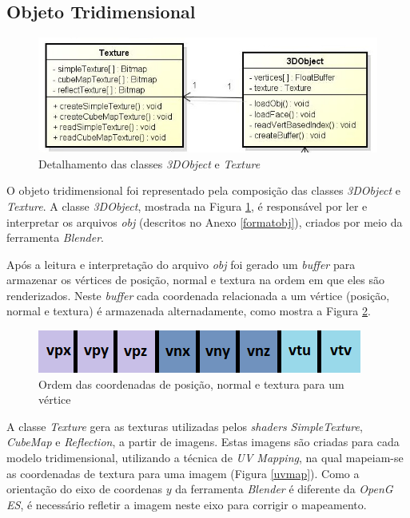 \subsection{Objeto Tridimensional}   

	\begin{figure}[ht]
	\centering
		\includegraphics[keepaspectratio=true,scale=0.6]{figuras/object_texture.jpg}
	\caption{Detalhamento das classes \textit{3DObject} e \textit{Texture}}
	\label{object_texture}
	\end{figure}

	O objeto tridimensional foi representado pela composição das classes \textit{3DObject} e \textit{Texture}. A classe \textit{3DObject}, mostrada na Figura \ref{object_texture}, é responsável por ler e interpretar os arquivos \textit{obj}  (descritos no Anexo \ref{formatobj}), criados por meio da ferramenta \textit{Blender}.

	Após a leitura e interpretação do arquivo \textit{obj} foi gerado um \textit{buffer} para armazenar os vértices de posição, normal e textura na ordem em que eles são renderizados. Neste \textit{buffer} cada coordenada relacionada a um vértice (posição, normal e textura) é armazenada alternadamente, como mostra a Figura \ref{buffer}.

	\begin{figure}[ht]
	\centering
		\includegraphics[keepaspectratio=true,scale=1.0]{figuras/buffer.png}
	\caption{Ordem das coordenadas de posição, normal e textura para um vértice}
	\label{buffer}
	\end{figure}

	A classe \textit{Texture} gera as texturas utilizadas pelos \textit{shaders} \textit{SimpleTexture}, \textit{CubeMap} e \textit{Reflection}, a partir de imagens. Estas imagens são criadas para cada modelo tridimensional, utilizando a técnica de \textit{UV Mapping}, na qual mapeiam-se as coordenadas de textura para uma imagem (Figura \ref{uvmap}). Como a orientação do eixo de coordenas $y$ da ferramenta \textit{Blender} é diferente da \textit{OpenG ES}, é necessário refletir a imagem neste eixo para corrigir o mapeamento.

